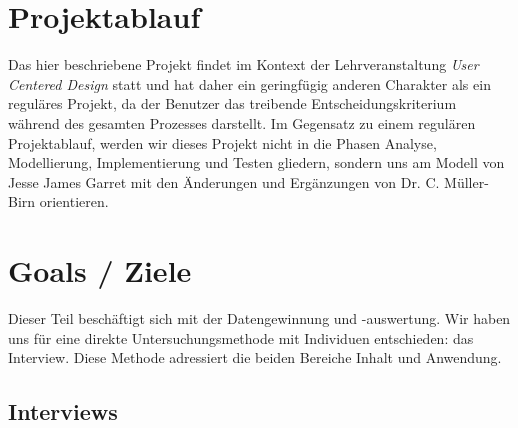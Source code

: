 \documentclass{article}
\begin{document}
\newpage

\section{Projektablauf}

Das hier beschriebene Projekt findet im Kontext der Lehrveranstaltung \textit{User Centered Design} statt und hat daher ein geringfügig anderen Charakter als ein reguläres Projekt, da der Benutzer das treibende Entscheidungskriterium während des gesamten Prozesses darstellt. Im Gegensatz zu einem regulären Projektablauf, werden wir dieses Projekt nicht in die Phasen Analyse, Modellierung, Implementierung und Testen gliedern, sondern uns am Modell von Jesse James Garret mit den Änderungen und Ergänzungen von Dr. C. Müller-Birn orientieren.

\newpage

\section{Goals / Ziele}

Dieser Teil beschäftigt sich mit der Datengewinnung und -auswertung. Wir haben uns für eine direkte Untersuchungsmethode mit Individuen entschieden: das Interview. Diese Methode adressiert die beiden Bereiche Inhalt und Anwendung.

\subsection{Interviews}
\end{document}
